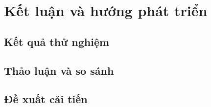 \chapter{Kết luận và hướng phát triển }\label{chapter_conclusion}

\section{Kết quả thử nghiệm}
\section{Thảo luận và so sánh}
\section{Đề xuất cải tiến}